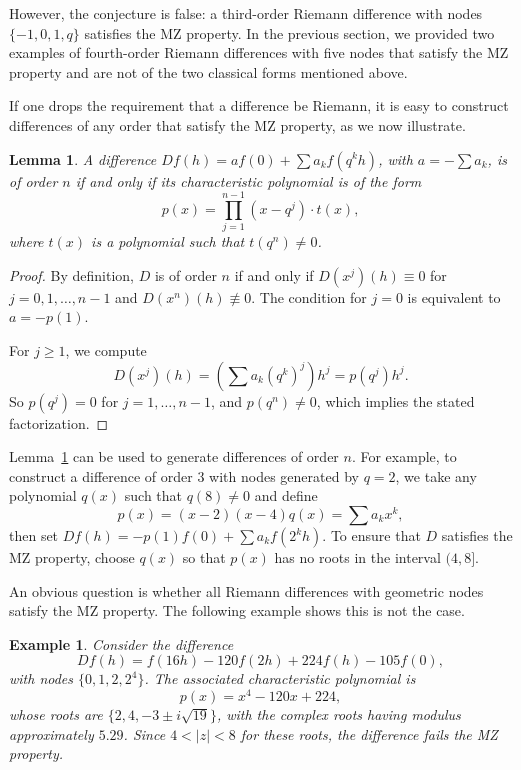 \documentclass{raex}
\newtheorem{example}[theorem]{Example}
\newtheorem{lemma}[theorem]{Lemma}
\theoremstyle{definition}
\begin{document}
However, the conjecture is false: a third-order Riemann difference with nodes $\{-1, 0, 1, q\}$ satisfies the MZ property. In the previous section, we provided two examples of fourth-order Riemann differences with five nodes that satisfy the MZ property and are not of the two classical forms mentioned above.

If one drops the requirement that a difference be Riemann, it is easy to construct differences of any order that satisfy the MZ property, as we now illustrate.

\begin{lemma}\label{l13}
A difference $Df(h) = a f(0) + \sum a_k f(q^k h)$, with $a = -\sum a_k$, is of order $n$ if and only if its characteristic polynomial is of the form
\[
p(x) = \prod_{j = 1}^{n - 1}(x - q^j) \cdot t(x),
\]
where $t(x)$ is a polynomial such that $t(q^n) \neq 0$.
\end{lemma}

\begin{proof}
By definition, $D$ is of order $n$ if and only if $D(x^j)(h) \equiv 0$ for $j = 0, 1, \ldots, n - 1$ and $D(x^n)(h) \not\equiv 0$. The condition for $j = 0$ is equivalent to $a = -p(1)$.

For $j \geq 1$, we compute
\[
D(x^j)(h) = \left( \sum a_k (q^k)^j \right) h^j = p(q^j) h^j.
\]
So $p(q^j) = 0$ for $j = 1, \ldots, n - 1$, and $p(q^n) \neq 0$, which implies the stated factorization.
\end{proof}

Lemma~\ref{l13} can be used to generate differences of order $n$. For example, to construct a difference of order $3$ with nodes generated by $q = 2$, we take any polynomial $q(x)$ such that $q(8) \neq 0$ and define
\[
p(x) = (x - 2)(x - 4)q(x) = \sum a_k x^k,
\]
then set $Df(h) = -p(1) f(0) + \sum a_k f(2^k h)$. To ensure that $D$ satisfies the MZ property, choose $q(x)$ so that $p(x)$ has no roots in the interval $(4, 8]$.

An obvious question is whether all Riemann differences with geometric nodes satisfy the MZ property. The following example shows this is not the case.

\begin{example}
Consider the difference
\[
Df(h) = f(16h) - 120 f(2h) + 224 f(h) - 105 f(0),
\]
with nodes $\{0, 1, 2, 2^4\}$. The associated characteristic polynomial is
\[
p(x) = x^4 - 120x + 224,
\]
whose roots are $\{2, 4, -3 \pm i \sqrt{19}\}$, with the complex roots having modulus approximately $5.29$. Since $4 < |z| < 8$ for these roots, the difference fails the MZ property.
\end{example}
\end{document}
